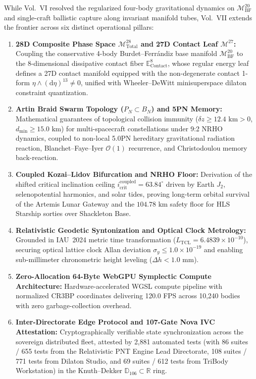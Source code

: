 \documentclass[11pt,a4paper,reqno]{article}
\theoremstyle{plain}
\theoremstyle{definition}
\theoremstyle{remark}
\numberwithin{equation}{section}
\numberwithin{table}{section}
\newcommand{\Ddd}{\mathbb{D}_{106}}
\newcommand{\MbfTwenty}{\mathcal{M}_{\mathrm{BF}}^{20}}
\newcommand{\Econtact}{\mathbb{E}_{\mathrm{Contact}}^8}
\newcommand{\Mtotal}{\mathcal{M}_{\mathrm{Total}}^{28}}
\providecommand{\diff}{\mathrm{d}}
\begin{document}
While Vol.~VI resolved the regularized four-body gravitational dynamics on $\MbfTwenty$ and single-craft ballistic capture along invariant manifold tubes, Vol.~VII extends the frontier across six distinct operational pillars:
\begin{enumerate}[label=\textbf{Pillar \Roman*:}, leftmargin=4.2em]
  \item \textbf{28D Composite Phase Space $\Mtotal$ and 27D Contact Leaf $\mathcal{M}^{27}$:} Coupling the conservative 4-body Burdet--Ferr\'andiz base manifold $\MbfTwenty$ to the 8-dimensional dissipative contact fiber $\Econtact$, whose regular energy leaf defines a 27D contact manifold equipped with the non-degenerate contact 1-form $\eta \wedge (\diff\eta)^{13} \ne 0$, unified with Wheeler--DeWitt minisuperspace dilaton constraint quantization.
  \item \textbf{Artin Braid Swarm Topology ($P_N \subset B_N$) and 5PN Memory:} Mathematical guarantees of topological collision immunity ($\delta z \ge 12.4\text{ km} > 0$, $d_{\min} \ge 15.0\text{ km}$) for multi-spacecraft constellations under 9:2 NRHO dynamics, coupled to non-local 5.0PN hereditary gravitational radiation reaction, Blanchet--Faye--Iyer $\mathcal{O}(1)$ recurrence, and Christodoulou memory back-reaction.
  \item \textbf{Coupled Kozai--Lidov Bifurcation and NRHO Floor:} Derivation of the shifted critical inclination ceiling $i_{\mathrm{crit}}^{\mathrm{coupled}} = 63.84^\circ$ driven by Earth $J_2$, selenopotential harmonics, and solar tides, proving long-term orbital survival of the Artemis Lunar Gateway and the $104.78\text{ km}$ safety floor for HLS Starship sorties over Shackleton Base.
  \item \textbf{Relativistic Geodetic Syntonization and Optical Clock Metrology:} Grounded in IAU~2024 metric time transformation ($L_{\mathrm{TCL}} = 6.4839 \times 10^{-10}$), securing optical lattice clock Allan deviation $\sigma_y \le 1.0 \times 10^{-19}$ and enabling sub-millimeter chronometric height leveling ($\Delta h < 1.0\text{ mm}$).
  \item \textbf{Zero-Allocation 64-Byte WebGPU Symplectic Compute Architecture:} Hardware-accelerated WGSL compute pipeline with normalized CR3BP coordinates delivering 120.0 FPS across 10,240 bodies with zero garbage-collection overhead.
  \item \textbf{Inter-Directorate Edge Protocol and 107-Gate Nova IVC Attestation:} Cryptographically verifiable state synchronization across the sovereign distributed fleet, attested by 2,881 automated tests (with 86 suites / 655 tests from the Relativistic PNT Engine Lead Directorate, 108 suites / 771 tests from Dilaton Studio, and 69 suites / 612 tests from TriBody Workstation) in the Knuth--Dekker $\Ddd \subset \mathbb{R}$ ring.
\end{enumerate}
\end{document}
